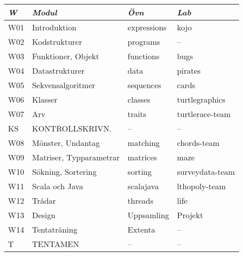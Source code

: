 \begin{tabular}{l|l|l|l}
\textit{W} & \textit{Modul} & \textit{Övn} & \textit{Lab} \\ \hline \hline
W01 & Introduktion            & expressions & kojo            \\
W02 & Kodstrukturer           & programs    & --              \\
W03 & Funktioner, Objekt      & functions   & bugs            \\
W04 & Datastrukturer          & data        & pirates         \\
W05 & Sekvensalgoritmer       & sequences   & cards           \\
W06 & Klasser                 & classes     & turtlegraphics  \\
W07 & Arv                     & traits      & turtlerace-team \\
KS  & KONTROLLSKRIVN.         & --          & --              \\
W08 & Mönster, Undantag       & matching    & chords-team     \\
W09 & Matriser, Typparametrar & matrices    & maze            \\
W10 & Sökning, Sortering      & sorting     & surveydata-team \\
W11 & Scala och Java          & scalajava   & lthopoly-team   \\
W12 & Trådar                  & threads     & life            \\
W13 & Design                  & Uppsamling  & Projekt         \\
W14 & Tentaträning            & Extenta     & --              \\
T   & TENTAMEN                & --          & --              \\
\end{tabular}
